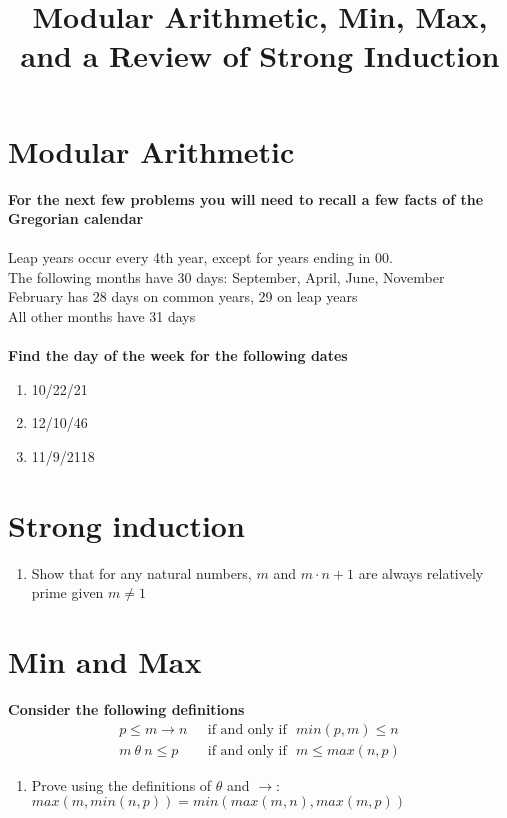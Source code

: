 \documentclass[12pt]{article}
\date{}
\author{}
\title{Modular Arithmetic, Min, Max, and a Review of Strong Induction}
\begin{document}
	\maketitle
	\section{Modular Arithmetic}
	\textbf{For the next few problems you will need to recall a few facts of the Gregorian calendar}
	\\
	\\Leap years occur every 4th year, except for years ending in 00.\\
	The following months have 30 days: September, April, June, November\\
	February has 28 days on common years, 29 on leap years\\
	All other months have 31 days\\
	\\
	\textbf{Find the day of the week for the following dates}
	\begin{enumerate}
		\item 10/22/21
		\item 12/10/46
		\item 11/9/2118
	\end{enumerate}
	\section{Strong induction}
	\begin{enumerate}[resume]
		\item Show that for any natural numbers, $m$ and $m\cdot n +1$ are always relatively prime given $m\neq1$
	\end{enumerate}
	\section{Min and Max}
	\textbf{Consider the following definitions}
	\begin{align*}
	p\leq m \to n \:\:\:&\text{if and only if}\:\:\: min(p,m)\leq n\\
	m \:\theta\: n \leq p\:\:\: &\text{if and only if}\:\:\: m\leq max(n,p) 
	\end{align*}
	\begin{enumerate}[resume]
		\item Prove using the definitions of $\theta$ and $\to$: $max(m,min(n,p))=min(max(m,n),max(m,p))$
	\end{enumerate}
\end{document}
